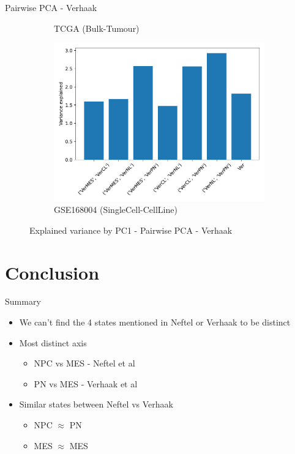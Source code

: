 \documentclass[aspectratio=169,9pt]{beamer}
\begin{document}
\begin{frame}{Pairwise PCA - Verhaak}
\begin{adjustwidth}{-5cm}{-5cm}
\begin{figure}
\begin{subfigure}[c]{0.38\textwidth}
                    \caption{TCGA (Bulk-Tumour)}
                \end{subfigure}
                \begin{subfigure}[c]{0.38\textwidth}
                    \centering
                    \includegraphics[width=\textwidth]{mgg23_expvar_Ver}
                    \caption{GSE168004 (SingleCell-CellLine)}
                \end{subfigure}
                \caption{Explained variance by PC1 - Pairwise PCA - Verhaak}
            \end{figure}
        \end{adjustwidth}
    \end{frame}

    \section{Conclusion}

    \begin{frame}{Summary}
        \begin{itemize}
            \item We can't find the 4 states mentioned in Neftel or Verhaak to be distinct
            \pause \item Most distinct axis
            \begin{itemize}
                \item NPC vs MES - Neftel et al
                \item PN vs MES - Verhaak et al
            \end{itemize}
            \pause \item Similar states between Neftel vs Verhaak
            \begin{itemize}
                \item NPC $\approx$ PN
                \item MES $\approx$ MES
            \end{itemize}
        \end{itemize}
    \end{frame}
\end{document}
